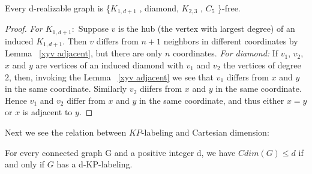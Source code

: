 \documentclass[12pt,a4paper,titlepage,openany]{report}
\begin{document}
\begin{theorem}
Every d-realizable graph is \{$K_{1,d+1}$ , diamond,
$K_{2,3}$ , $C_5$ \}-free.
\end{theorem} 
\begin{proof}
\textit{For $K_{1,d+1}:$} Suppose $v$ is the hub (the vertex with largest degree) of an induced $K_{1,d+1}$. Then $v$ differs from $n+1$ neighbors in different coordinates by Lemma ~\ref{xyv adjacent}, but there are only $n$ coordinates.\newline
\textit{For diamond:} If $v_1$, $v_2$, $x$ and $y$ are vertices of an induced diamond with $v_1$ and $v_2$ the vertices of degree $2$, then, invoking the Lemma ~\ref{xyv adjacent} we see that $v_1$ differs from $x$ and $y$ in the same coordinate. Similarly $v_2$ diifers from $x$ and $y$ in the same coordinate. Hence $v_1$ and $v_2$ differ from $x$ and $y$ in the same coordinate, and thus either $x=y$ or $x$ is adjacent to $y$. 
\end{proof}
Next we see the relation between $KP$-labeling and Cartesian dimension:
 \begin{theorem}
For every connected graph G and a positive integer d, we have $Cdim(G) \leq d$ if and only if $G$ has a d-KP-labeling.
\end{theorem}
\end{document}
